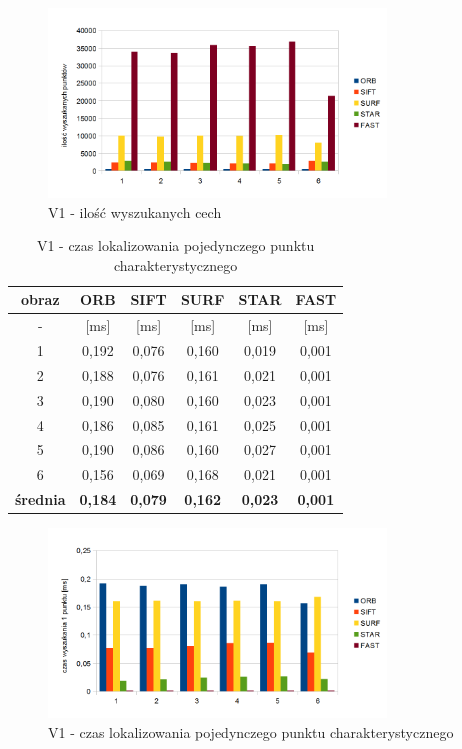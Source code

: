 \begin{figure}
\centering
\includegraphics[width=0.8\textwidth]{pict/slowik/v1/F1.png}
\caption{V1 - ilość wyszukanych cech}
\label{fig:v1_f1}
\end{figure}


\begin{table}[htbp]
  \centering
  \caption{V1 - czas lokalizowania pojedynczego punktu charakterystycznego}
    \begin{tabular}{|c|c|c|c|c|c|}
    \hline
    obraz & \textbf{ORB} & \textbf{SIFT} & \textbf{SURF} & \textbf{STAR} & \textbf{FAST} \\
    \hline
    -  & [ms] & [ms] & [ms] & [ms] & [ms] \\\hline
    1 & 0,192 & 0,076 & 0,160 & 0,019 & 0,001 \\
    2 & 0,188 & 0,076 & 0,161 & 0,021 & 0,001 \\
    3 & 0,190 & 0,080 & 0,160 & 0,023 & 0,001 \\
    4 & 0,186 & 0,085 & 0,161 & 0,025 & 0,001 \\
    5 & 0,190 & 0,086 & 0,160 & 0,027 & 0,001 \\
    6 & 0,156 & 0,069 & 0,168 & 0,021 & 0,001 \\\hline
    \textbf{średnia} & \textbf{0,184} & \textbf{0,079} & \textbf{0,162} & \textbf{0,023} & \textbf{0,001} \\
    \hline
    \end{tabular}%
  \label{tab:v1_f2}%
\end{table}%


\begin{figure}
\centering
\includegraphics[width=0.8\textwidth]{pict/slowik/v1/f2.png}
\caption{V1 - czas lokalizowania pojedynczego punktu charakterystycznego}
\label{fig:v1_f2}
\end{figure}

